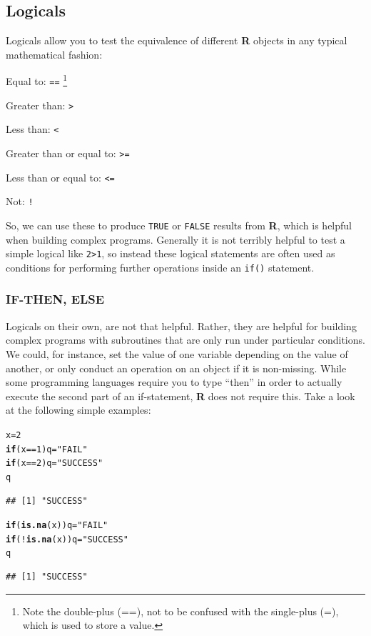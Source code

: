 \documentclass[12pt]{article}\usepackage[]{graphicx}\usepackage[]{color}
\makeatletter
\newcommand{\hlnum}[1]{\textcolor[rgb]{0.686,0.059,0.569}{#1}}%
\newcommand{\hlstr}[1]{\textcolor[rgb]{0.192,0.494,0.8}{#1}}%
\newcommand{\hlopt}[1]{\textcolor[rgb]{0,0,0}{#1}}%
\newcommand{\hlstd}[1]{\textcolor[rgb]{0.345,0.345,0.345}{#1}}%
\newcommand{\hlkwa}[1]{\textcolor[rgb]{0.161,0.373,0.58}{\textbf{#1}}}%
\newcommand{\hlkwb}[1]{\textcolor[rgb]{0.69,0.353,0.396}{#1}}%
\newcommand{\hlkwd}[1]{\textcolor[rgb]{0.737,0.353,0.396}{\textbf{#1}}}%
\newenvironment{kframe}{%
 \def\at@end@of@kframe{}%
 \ifinner\ifhmode%
  \def\at@end@of@kframe{\end{minipage}}%
  \begin{minipage}{\columnwidth}%
 \fi\fi%
 \def\FrameCommand##1{\hskip\@totalleftmargin \hskip-\fboxsep
 \colorbox{shadecolor}{##1}\hskip-\fboxsep
     \hskip-\linewidth \hskip-\@totalleftmargin \hskip\columnwidth}%
 \MakeFramed {\advance\hsize-\width
   \@totalleftmargin\z@ \linewidth\hsize
   \@setminipage}}%
 {\par\unskip\endMakeFramed%
 \at@end@of@kframe}
\newenvironment{knitrout}{}{} %
\makeatother
\begin{document}
\subsection{Logicals}
Logicals allow you to test the equivalence of different \textbf{R} objects in any typical mathematical fashion:
\begin{itemize*}
\item Equal to: \verb|==| \footnote{Note the double-plus (==), not to be confused with the single-plus (=), which is used to store a value.}
\item Greater than: \verb|>|
\item Less than: \verb|<|
\item Greater than or equal to: \verb|>=|
\item Less than or equal to: \verb|<=|
\item Not: \verb|!|
\end{itemize*}
So, we can use these to produce \verb|TRUE| or \verb|FALSE| results from \textbf{R}, which is helpful when building complex programs. Generally it is not terribly helpful to test a simple logical like \verb|2>1|, so instead these logical statements are often used as conditions for performing further operations inside an \verb|if()| statement.

\subsubsection{IF-THEN, ELSE}
Logicals on their own, are not that helpful. Rather, they are helpful for building complex programs with subroutines that are only run under particular conditions. We could, for instance, set the value of one variable depending on the value of another, or only conduct an operation on an object if it is non-missing. While some programming languages require you to type ``then'' in order to actually execute the second part of an if-statement, \textbf{R} does not require this. Take a look at the following simple examples:
\begin{knitrout}
\color{fgcolor}\begin{kframe}
\begin{alltt}
\hlstd{x} \hlkwb{=} \hlnum{2}
\hlkwa{if} \hlstd{(x} \hlopt{==} \hlnum{1}\hlstd{) q} \hlkwb{=} \hlstr{"FAIL"}
\hlkwa{if} \hlstd{(x} \hlopt{==} \hlnum{2}\hlstd{) q} \hlkwb{=} \hlstr{"SUCCESS"}
\hlstd{q}
\end{alltt}
\begin{verbatim}
## [1] "SUCCESS"
\end{verbatim}
\begin{alltt}
\hlkwa{if} \hlstd{(}\hlkwd{is.na}\hlstd{(x)) q} \hlkwb{=} \hlstr{"FAIL"}
\hlkwa{if} \hlstd{(}\hlopt{!}\hlkwd{is.na}\hlstd{(x)) q} \hlkwb{=} \hlstr{"SUCCESS"}
\hlstd{q}
\end{alltt}
\begin{verbatim}
## [1] "SUCCESS"
\end{verbatim}
\end{kframe}
\end{knitrout}
\end{document}

